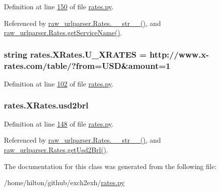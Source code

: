 Definition at line \hyperlink{rates_8py_source_l00150}{150} of file \hyperlink{rates_8py_source}{rates.\+py}.



Referenced by \hyperlink{raw__urlparser_8py_source_l00038}{raw\+\_\+urlparser.\+Rates.\+\_\+\+\_\+str\+\_\+\+\_\+()}, and \hyperlink{raw__urlparser_8py_source_l00035}{raw\+\_\+urlparser.\+Rates.\+get\+Service\+Name()}.

\subsubsection[{\texorpdfstring{U\+\_\+\+X\+R\+A\+T\+ES}{U_XRATES}}]{\setlength{\rightskip}{0pt plus 5cm}string rates.\+X\+Rates.\+U\+\_\+\+X\+R\+A\+T\+ES = \textquotesingle{}http\+://www.\+x-\/rates.\+com/table/?from=U\+SD\&amount=1\textquotesingle{}\hspace{0.3cm}{\ttfamily [static]}}\hypertarget{classrates_1_1_x_rates_ab3bd64c08e6503f0d76c9f73dc38fa25}{}\label{classrates_1_1_x_rates_ab3bd64c08e6503f0d76c9f73dc38fa25}


Definition at line \hyperlink{rates_8py_source_l00102}{102} of file \hyperlink{rates_8py_source}{rates.\+py}.

\subsubsection[{\texorpdfstring{usd2brl}{usd2brl}}]{\setlength{\rightskip}{0pt plus 5cm}rates.\+X\+Rates.\+usd2brl}\hypertarget{classrates_1_1_x_rates_a79fbb88d6331909d4023129dde29d2b8}{}\label{classrates_1_1_x_rates_a79fbb88d6331909d4023129dde29d2b8}


Definition at line \hyperlink{rates_8py_source_l00148}{148} of file \hyperlink{rates_8py_source}{rates.\+py}.



Referenced by \hyperlink{raw__urlparser_8py_source_l00038}{raw\+\_\+urlparser.\+Rates.\+\_\+\+\_\+str\+\_\+\+\_\+()}, and \hyperlink{raw__urlparser_8py_source_l00032}{raw\+\_\+urlparser.\+Rates.\+get\+Usd2\+Brl()}.



The documentation for this class was generated from the following file\+:\begin{DoxyCompactItemize}
\item 
/home/hilton/github/exch2exh/\hyperlink{rates_8py}{rates.\+py}\end{DoxyCompactItemize}
